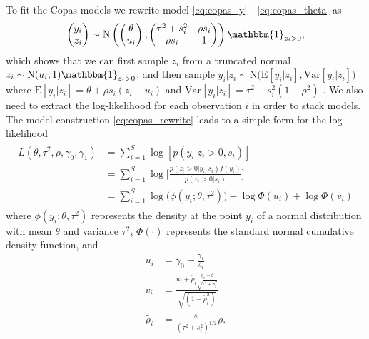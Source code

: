 \documentclass[12pt]{article}   	%
\numberwithin{equation}{section}
\begin{document}
To fit the Copas models we rewrite model \eqref{eq:copas_y} - \eqref{eq:copas_theta} as 
\begin{align}
\begin{pmatrix}
y_i \\
z_i
\end{pmatrix}\sim \text{N} \left(\begin{pmatrix}
\theta \\
u_i
\end{pmatrix},\begin{pmatrix}
\tau^2 + s_i^2 & \rho s_i \\
\rho s_i & 1
\end{pmatrix}\right) \mathbbm{1}_{z_i > 0}, \label{eq:copas_rewrite}
\end{align}
which shows that we can first sample $z_i$ from a truncated normal $z_i \sim \text{N}(u_i, 1) \mathbbm{1}_{z_i > 0}$, and then sample $y_i \vert z_i \sim \text{N}\big(\text{E}[y_i \vert z_i], \text{Var}[y_i \vert z_i]\big)$ where $\text{E}[y_i \vert z_i] = \theta + \rho s_i (z_i - u_i)$ and $\text{Var}[y_i \vert z_i] = \tau^2 + s_i^2 (1 - \rho ^ 2)$ \citep{mavridis2013copas}. We also need to extract the log-likelihood for each observation $i$ in order to stack models. The model construction \eqref{eq:copas_rewrite} leads to a simple form for the log-likelihood 
\begin{align}
\begin{split}
L(\theta, \tau^2, \rho, \gamma_0, \gamma_1) &= \sum_{i = 1} ^ S \log[p(y_i \vert z_i > 0, s_i)] \\
& = \sum_{i = 1} ^ S \log \Bigg[ \frac{p(z_i > 0 \vert y_i, s_i) f(y_i)}{p(z_i > 0 \vert s_i)} \Bigg] \\
& = \sum_{i = 1} ^ S \log\big(\phi(y_i ; \theta, \tau^2)\big) - \log \Phi(u_i) + \log \Phi(v_i) \label{eq:loglik}
\end{split}
\end{align}
where $\phi(y_i; \theta, \tau^2)$ represents the density at the point $y_i$ of a normal distribution with mean $\theta$ and variance $\tau^2$, $\Phi(\cdot)$ represents the standard normal cumulative density function, and 
\begin{align}
u_i &= \gamma_0 + \frac{\gamma_1}{s_i} \nonumber \\
v_i &= \frac{u_i + \tilde{\rho}_i \frac{y_i - \theta}{\sqrt{\tau^2 + s_i^2}}}{\sqrt{(1 - \tilde{\rho}_i^2)}} \nonumber \\
\tilde{\rho_i} &= \frac{s_i}{(\tau^2 + s_i^2)^{1/2}} \rho. \nonumber
\end{align}
\end{document}
